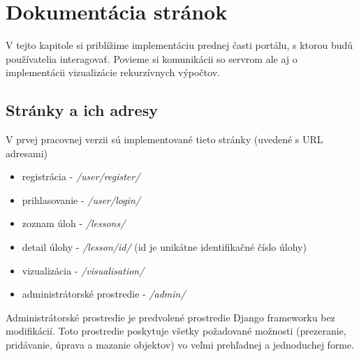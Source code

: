 \chapter{Dokumentácia stránok}

\label{kap:frontImpl}
V tejto kapitole si priblížime implementáciu prednej časti portálu, s ktorou
budú používatelia interagovať. Povieme si komunikácii so servrom ale aj o
implementácii vizualizácie rekurzívnych výpočtov.
\section{Stránky a ich adresy}
V prvej pracovnej verzii sú implementované tieto stránky (uvedené s URL adresami)
\begin{itemize}
  \item registrácia - \textit{/user/register/}
  \item prihlasovanie - \textit{/user/login/}
  \item zoznam úloh - \textit{/lessons/}
  \item detail úlohy - \textit{/lesson/id/} (id je unikátne identifikačné číslo úlohy)
  \item vizualizácia - \textit{/visualisation/}
  \item administrátorské prostredie - \textit{/admin/}
\end{itemize}

Administrátorské prostredie je predvolené prostredie Django frameworku bez modifikácií.
Toto prostredie poskytuje všetky požadované možnosti (prezeranie, pridávanie, úprava
a mazanie objektov) vo veľmi prehľadnej a jednoduchej forme.
